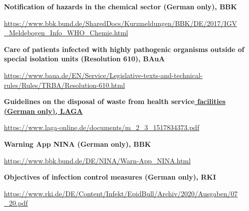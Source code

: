 \documentclass{article}
\begin{document}
\textbf{Notification of hazards in the chemical sector (German only), BBK} 


\href{https://www.bbk.bund.de/SharedDocs/Kurzmeldungen/BBK/DE/2017/IGV_Meldebogen_Info_WHO_Chemie.html}{https://www.bbk.bund.de/SharedDocs/Kurzmeldungen/BBK/DE/2017/IGV} \href{https://www.bbk.bund.de/SharedDocs/Kurzmeldungen/BBK/DE/2017/IGV_Meldebogen_Info_WHO_Chemie.html}{\_Meldebogen\_Info\_WHO\_Chemie.html} 


\textbf{Care of patients infected with highly pathogenic organisms outside of special isolation units (Resolution 610), BAuA}


\href{https://www.baua.de/EN/Service/Legislative-texts-and-technical-rules/Rules/TRBA/Resolution-610.html}{https://www.baua.de/EN/Service/Legislative-texts-and-technical-rules/Rules/TRBA/Resolution-610.html}


\textbf{Guidelines on the disposal of waste from health service}\textbf{\href{https://www.laga-online.de/documents/m_2_3_1517834373.pdf}{ facilities (German only), LAGA}}


\href{https://www.laga-online.de/documents/m_2_3_1517834373.pdf}{https://www.laga-online.de/documents/m\_2\_3\_1517834373.pdf}


\textbf{Warning App NINA (German only), BBK}


\href{https://www.bbk.bund.de/DE/NINA/Warn-App_NINA.html}{https://www.bbk.bund.de/DE/NINA/Warn-App\_NINA.html}


\textbf{Objectives of infection control measures (German only), RKI}


\href{https://www.rki.de/DE/Content/Infekt/EpidBull/Archiv/2020/Ausgaben/07_20.pdf}{https://www.rki.de/DE/Content/Infekt/EpidBull/Archiv/2020/Ausgaben/07} \href{https://www.rki.de/DE/Content/Infekt/EpidBull/Archiv/2020/Ausgaben/07_20.pdf}{\_20.pdf} 
\end{document}
